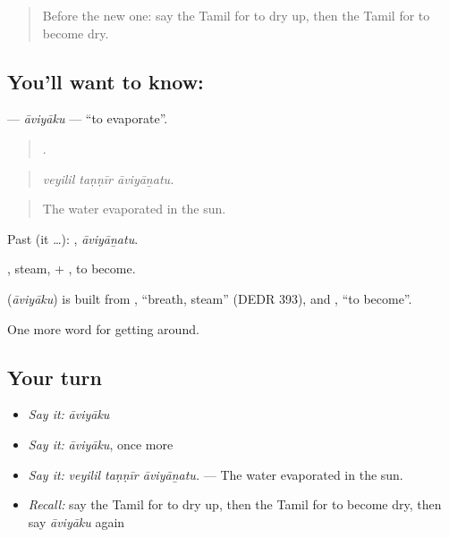 \label{lesson:TA-C431-aviyaku}



\begin{quote}
Before the new one: say the Tamil for to dry up, then the Tamil for to become dry.
\end{quote}

\subsection*{You'll want to know: }
\textbf{} — \emph{āviyāku} — \textquotedblleft{}to evaporate\textquotedblright{}.

\begin{quote}
  .
\end{quote}

\begin{quote}
\emph{veyilil taṇṇīr āviyāṉatu.}
\end{quote}

\begin{quote}
The water evaporated in the sun.
\end{quote}

Past (it …): , \emph{āviyāṉatu}.

, steam, + , to become.

\begin{cousinweb}
\textbf{} (\emph{āviyāku}) is built from , \textquotedblleft{}breath, steam\textquotedblright{} (DEDR 393), and , \textquotedblleft{}to become\textquotedblright{}.
\end{cousinweb}

\begin{grammarlens}[title={What you've built}]
One more word for getting around.
\end{grammarlens}

\subsection*{Your turn}
\begin{itemize}
\raggedright
  \item \emph{Say it:} \emph{āviyāku}
  \item \emph{Say it:} \emph{āviyāku}, once more
  \item \emph{Say it:} \emph{veyilil taṇṇīr āviyāṉatu.} — The water evaporated in the sun.
  \item \emph{Recall:} say the Tamil for to dry up, then the Tamil for to become dry, then say \emph{āviyāku} again
\end{itemize}

